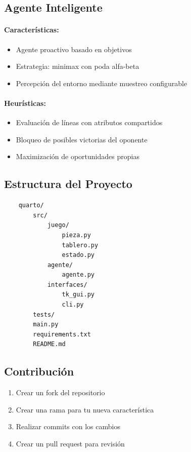 \documentclass[conference]{IEEEtran}
\begin{document}
\subsection{Agente Inteligente}

\paragraph{Características:}
\begin{itemize}
	\item Agente proactivo basado en objetivos
	\item Estrategia: minimax con poda alfa-beta
	\item Percepción del entorno mediante muestreo configurable
\end{itemize}

\paragraph{Heurísticas:}
\begin{itemize}
	\item Evaluación de líneas con atributos compartidos
	\item Bloqueo de posibles victorias del oponente
	\item Maximización de oportunidades propias
\end{itemize}

\subsection{Estructura del Proyecto}
\begin{verbatim}
	quarto/
		src/
			juego/
				pieza.py
				tablero.py
				estado.py
			agente/
				agente.py
			interfaces/
				tk_gui.py
				cli.py
		tests/
		main.py
		requirements.txt
		README.md
\end{verbatim}

\subsection{Contribución}
\begin{enumerate}
	\item Crear un fork del repositorio
	\item Crear una rama para tu nueva característica
	\item Realizar commits con los cambios
	\item Crear un pull request para revisión
\end{enumerate}
\end{document}
